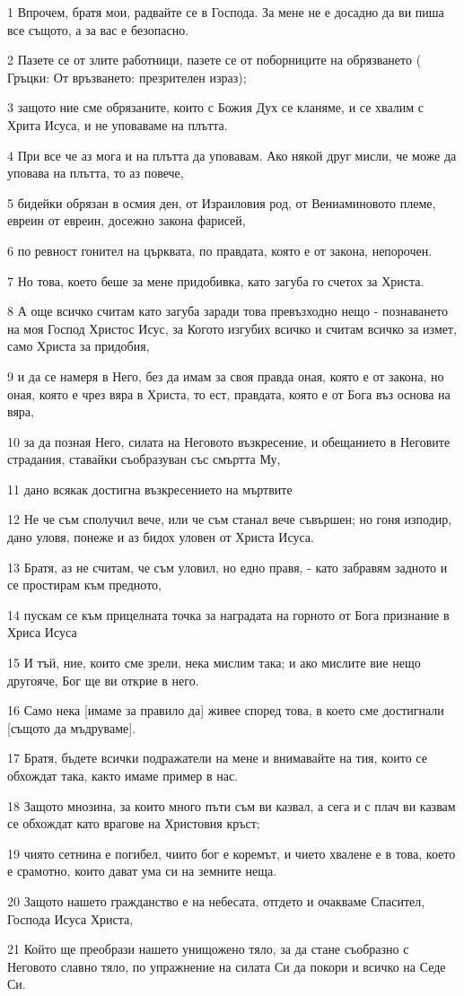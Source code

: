 \par 1 Впрочем, братя мои, радвайте се в Господа. За мене не е досадно да ви пиша все същото, а за вас е безопасно.
\par 2 Пазете се от злите работници, пазете се от поборниците на обрязването ( Гръцки: От връзването: презрителен израз);
\par 3 защото ние сме обрязаните, които с Божия Дух се кланяме, и се хвалим с Хрита Исуса, и не уповаваме на плътта.
\par 4 При все че аз мога и на плътта да уповавам. Ако някой друг мисли, че може да уповава на плътта, то аз повече,
\par 5 бидейки обрязан в осмия ден, от Израиловия род, от Вениаминовото племе, евреин от евреин, досежно закона фарисей,
\par 6 по ревност гонител на църквата, по правдата, която е от закона, непорочен.
\par 7 Но това, което беше за мене придобивка, като загуба го счетох за Христа.
\par 8 А още всичко считам като загуба заради това превъзходно нещо - познаването на моя Господ Христос Исус, за Когото изгубих всичко и считам всичко за измет, само Христа за придобия,
\par 9 и да се намеря в Него, без да имам за своя правда оная, която е от закона, но оная, която е чрез вяра в Христа, то ест, правдата, която е от Бога въз основа на вяра,
\par 10 за да позная Него, силата на Неговото възкресение, и обещанието в Неговите страдания, ставайки съобразуван със смъртта Му,
\par 11 дано всякак достигна възкресението на мъртвите
\par 12 Не че съм сполучил вече, или че съм станал вече съвършен; но гоня изподир, дано уловя, понеже и аз бидох уловен от Христа Исуса.
\par 13 Братя, аз не считам, че съм уловил, но едно правя, - като забравям задното и се простирам към предното,
\par 14 пускам се към прицелната точка за наградата на горното от Бога признание в Хриса Исуса
\par 15 И тъй, ние, които сме зрели, нека мислим така; и ако мислите вие нещо другояче, Бог ще ви открие в него.
\par 16 Само нека [имаме за правило да] живее според това, в което сме достигнали [същото да мъдруваме].
\par 17 Братя, бъдете всички подражатели на мене и внимавайте на тия, които се обхождат така, както имаме пример в нас.
\par 18 Защото мнозина, за които много пъти съм ви казвал, а сега и с плач ви казвам се обхождат като врагове на Христовия кръст;
\par 19 чиято сетнина е погибел, чиито бог е коремът, и чието хвалене е в това, което е срамотно, които дават ума си на земните неща.
\par 20 Защото нашето гражданство е на небесата, отгдето и очакваме Спасител, Господа Исуса Христа,
\par 21 Който ще преобрази нашето унищожено тяло, за да стане съобразно с Неговото славно тяло, по упражнение на силата Си да покори и всичко на Седе Си.

